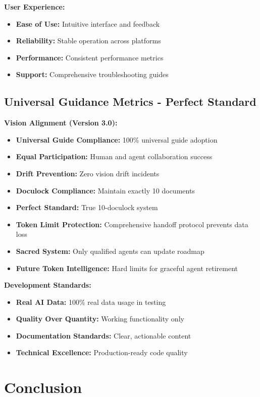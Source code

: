 \documentclass[12pt,a4paper]{article}
\begin{document}
\textbf{User Experience:}
\begin{itemize}
    \item \textbf{Ease of Use:} Intuitive interface and feedback
    \item \textbf{Reliability:} Stable operation across platforms
    \item \textbf{Performance:} Consistent performance metrics
    \item \textbf{Support:} Comprehensive troubleshooting guides
\end{itemize}

\subsection{Universal Guidance Metrics - Perfect Standard}

\textbf{Vision Alignment (Version 3.0):}
\begin{itemize}
    \item \textbf{Universal Guide Compliance:} 100\% universal guide adoption
    \item \textbf{Equal Participation:} Human and agent collaboration success
    \item \textbf{Drift Prevention:} Zero vision drift incidents
    \item \textbf{Doculock Compliance:} Maintain exactly 10 documents
    \item \textbf{Perfect Standard:} True 10-doculock system
    \item \textbf{Token Limit Protection:} Comprehensive handoff protocol prevents data loss
    \item \textbf{Sacred System:} Only qualified agents can update roadmap
    \item \textbf{Future Token Intelligence:} Hard limits for graceful agent retirement
\end{itemize}

\textbf{Development Standards:}
\begin{itemize}
    \item \textbf{Real AI Data:} 100\% real data usage in testing
    \item \textbf{Quality Over Quantity:} Working functionality only
    \item \textbf{Documentation Standards:} Clear, actionable content
    \item \textbf{Technical Excellence:} Production-ready code quality
\end{itemize}

\section{Conclusion}
\end{document}
